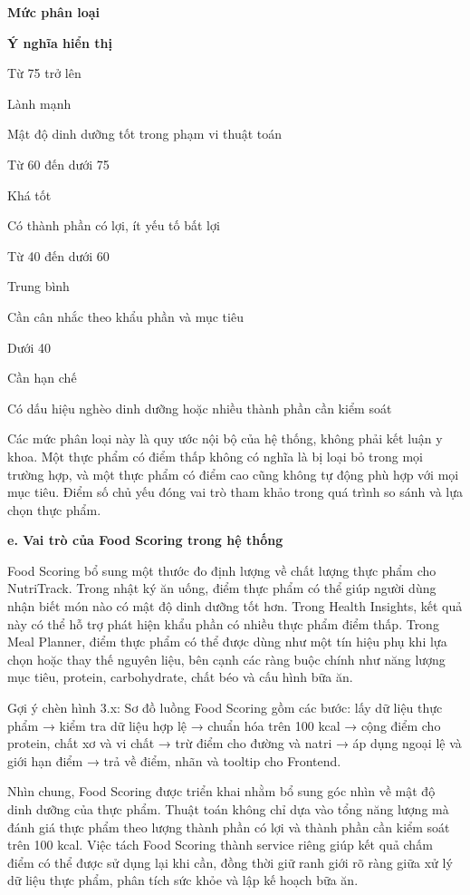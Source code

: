 \documentclass[12pt, a4paper]{report}
\begin{document}
\textbf{Mức phân loại}

\textbf{Ý nghĩa hiển thị}

Từ 75 trở lên

Lành mạnh

Mật độ dinh dưỡng tốt trong phạm vi thuật toán

Từ 60 đến dưới 75

Khá tốt

Có thành phần có lợi, ít yếu tố bất lợi

Từ 40 đến dưới 60

Trung bình

Cần cân nhắc theo khẩu phần và mục tiêu

Dưới 40

Cần hạn chế

Có dấu hiệu nghèo dinh dưỡng hoặc nhiều thành phần cần kiểm soát

Các mức phân loại này là quy ước nội bộ của hệ thống, không phải kết luận y khoa. Một thực phẩm có điểm thấp không có nghĩa là bị loại bỏ trong mọi trường hợp, và một thực phẩm có điểm cao cũng không tự động phù hợp với mọi mục tiêu. Điểm số chủ yếu đóng vai trò tham khảo trong quá trình so sánh và lựa chọn thực phẩm.

\textbf{e. Vai trò của Food Scoring trong hệ thống}

Food Scoring bổ sung một thước đo định lượng về chất lượng thực phẩm cho NutriTrack. Trong nhật ký ăn uống, điểm thực phẩm có thể giúp người dùng nhận biết món nào có mật độ dinh dưỡng tốt hơn. Trong Health Insights, kết quả này có thể hỗ trợ phát hiện khẩu phần có nhiều thực phẩm điểm thấp. Trong Meal Planner, điểm thực phẩm có thể được dùng như một tín hiệu phụ khi lựa chọn hoặc thay thế nguyên liệu, bên cạnh các ràng buộc chính như năng lượng mục tiêu, protein, carbohydrate, chất béo và cấu hình bữa ăn.

Gợi ý chèn hình 3.x: Sơ đồ luồng Food Scoring gồm các bước: lấy dữ liệu thực phẩm → kiểm tra dữ liệu hợp lệ → chuẩn hóa trên 100 kcal → cộng điểm cho protein, chất xơ và vi chất → trừ điểm cho đường và natri → áp dụng ngoại lệ và giới hạn điểm → trả về điểm, nhãn và tooltip cho Frontend.

Nhìn chung, Food Scoring được triển khai nhằm bổ sung góc nhìn về mật độ dinh dưỡng của thực phẩm. Thuật toán không chỉ dựa vào tổng năng lượng mà đánh giá thực phẩm theo lượng thành phần có lợi và thành phần cần kiểm soát trên 100 kcal. Việc tách Food Scoring thành service riêng giúp kết quả chấm điểm có thể được sử dụng lại khi cần, đồng thời giữ ranh giới rõ ràng giữa xử lý dữ liệu thực phẩm, phân tích sức khỏe và lập kế hoạch bữa ăn.
\end{document}
